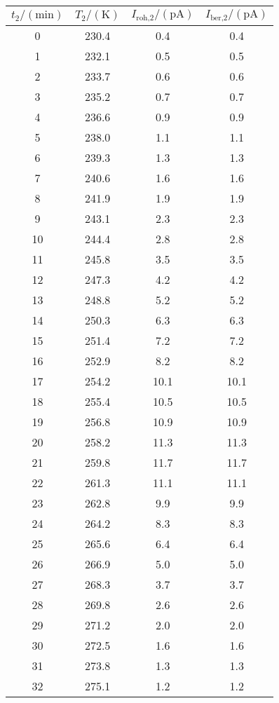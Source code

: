 \label{tab:tabData2}
	\begin{tabular}{S[table-format=2.0]S[table-format=3.1]S[table-format=2.1]S[table-format=2.1]}
		\toprule
		{$t_\text{2}/(\si{\minute})$} & {$T_\text{2}/(\si{\kelvin})$} & {$I_\text{roh,2}/(\si{\pico\ampere})$} & {$I_\text{ber,2}/(\si{\pico\ampere})$} \\
		 & 230.4 & 0.4 & 0.4 \\
		 1 & 232.1 & 0.5 & 0.5 \\
		 2 & 233.7 & 0.6 & 0.6 \\
		 3 & 235.2 & 0.7 & 0.7 \\
		 4 & 236.6 & 0.9 & 0.9 \\
		 5 & 238.0 & 1.1 & 1.1 \\
		 6 & 239.3 & 1.3 & 1.3 \\
		 7 & 240.6 & 1.6 & 1.6 \\
		 8 & 241.9 & 1.9 & 1.9 \\
		 9 & 243.1 & 2.3 & 2.3 \\
		10 & 244.4 & 2.8 & 2.8 \\
		11 & 245.8 & 3.5 & 3.5 \\
		12 & 247.3 & 4.2 & 4.2 \\
		13 & 248.8 & 5.2 & 5.2 \\
		14 & 250.3 & 6.3 & 6.3 \\
		15 & 251.4 & 7.2 & 7.2 \\
		16 & 252.9 & 8.2 & 8.2 \\
		17 & 254.2 & 10.1 & 10.1 \\
		18 & 255.4 & 10.5 & 10.5 \\
		19 & 256.8 & 10.9 & 10.9 \\
		20 & 258.2 & 11.3 & 11.3 \\
		21 & 259.8 & 11.7 & 11.7 \\
		22 & 261.3 & 11.1 & 11.1 \\
		23 & 262.8 & 9.9 & 9.9 \\
		24 & 264.2 & 8.3 & 8.3 \\
		25 & 265.6 & 6.4 & 6.4 \\
		26 & 266.9 & 5.0 & 5.0 \\
		27 & 268.3 & 3.7 & 3.7 \\
		28 & 269.8 & 2.6 & 2.6 \\
		29 & 271.2 & 2.0 & 2.0 \\
		30 & 272.5 & 1.6 & 1.6 \\
		31 & 273.8 & 1.3 & 1.3 \\
		32 & 275.1 & 1.2 & 1.2 \\

\end{tabular}
